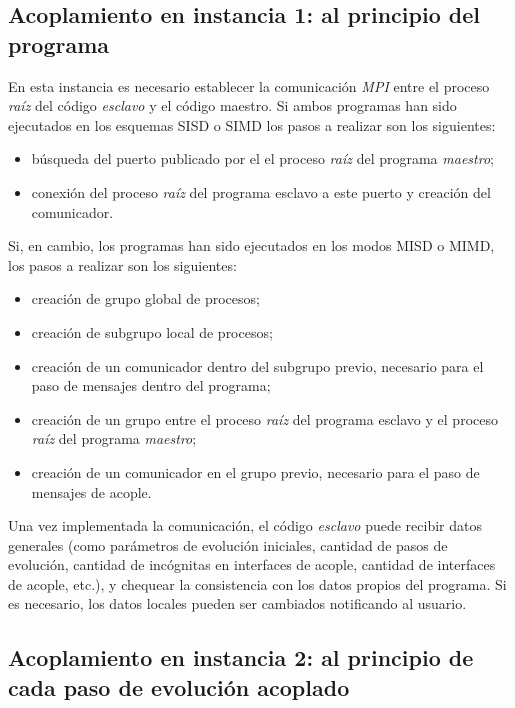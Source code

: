 \subsection*{Acoplamiento en instancia 1: al principio del programa}

En esta instancia es necesario establecer la comunicación \textit{MPI} entre el proceso \textit{raíz} del código \textit{esclavo} y el código maestro.
Si ambos programas han sido ejecutados en los esquemas SISD o SIMD los pasos a realizar son los siguientes:
\begin{itemize}
\item búsqueda del puerto publicado por el el proceso \textit{raíz} del programa \textit{maestro};
\item conexión del proceso \textit{raíz} del programa esclavo a este puerto y creación del comunicador.
\end{itemize}
Si, en cambio, los programas han sido ejecutados en los modos MISD o MIMD, los pasos a realizar son los siguientes:
\begin{itemize}
\item creación de grupo global de procesos;
\item creación de subgrupo local de procesos;
\item creación de un comunicador dentro del subgrupo previo, necesario para el paso de mensajes dentro del programa;
\item creación de un grupo entre el proceso \textit{raíz} del programa esclavo y el proceso \textit{raíz} del programa \textit{maestro};
\item creación de un comunicador en el grupo previo, necesario para el paso de mensajes de acople.
\end{itemize}
Una vez implementada la comunicación, el código \textit{esclavo} puede recibir datos generales 
(como parámetros de evolución iniciales, cantidad de pasos de evolución, cantidad de incógnitas en interfaces de acople, cantidad de interfaces de acople, etc.),
y chequear la consistencia con los datos propios del programa.
Si es necesario, los datos locales pueden ser cambiados notificando al usuario.

\subsection*{Acoplamiento en instancia 2: al principio de cada paso de evolución acoplado}


